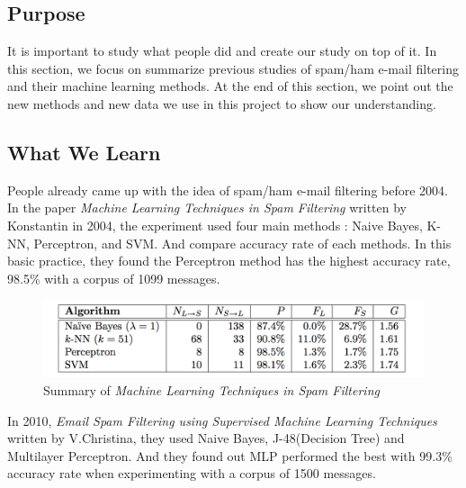 
\subsection{Purpose}

It is important to study what people did and create our study on top of it. In this section, we focus on summarize previous studies of spam/ham e-mail filtering and their machine learning methods. At the end of this section, we point out the new methods and new data we use in this project to show our understanding.  \\

\subsection{What We Learn}
People already came up with the idea of spam/ham e-mail filtering before 2004. In the paper \textit{Machine Learning Techniques in Spam Filtering} written by Konstantin in 2004, the experiment used four main methods : Naive Bayes, K-NN, Perceptron, and SVM. And compare accuracy rate of each methods. In this basic practice, they found the Perceptron method has the highest accuracy rate, 98.5\% with a corpus of 1099 messages. \\

\begin{figure}[H]
	\centering
	\includegraphics[scale=1.0, width=\linewidth]{./plots/2004.png}
	\caption{Summary of \textit{Machine Learning Techniques in Spam Filtering}}
	\label{paper_summary_2004}
\end{figure}

In 2010, \textit{Email Spam Filtering using Supervised Machine Learning Techniques } written by V.Christina, they used Naive Bayes, J-48(Decision Tree) and Multilayer Perceptron. And they found out MLP performed the best with 99.3\% accuracy rate when experimenting with a corpus of 1500 messages.\\

